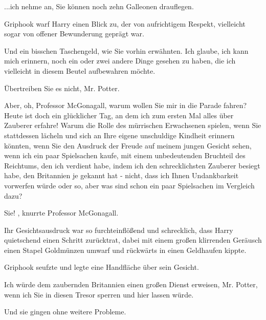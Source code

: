 \glqq ...ich nehme an, Sie können noch zehn
Galleonen drauflegen.\grqq{}

Griphook warf Harry einen Blick zu, der von aufrichtigem Respekt, vielleicht
sogar von offener Bewunderung geprägt war.

\glqq Und ein bisschen Taschengeld, wie Sie vorhin erwähnten. Ich
glaube, ich kann mich erinnern, noch ein oder zwei andere Dinge gesehen zu haben, die ich vielleicht in diesem Beutel
aufbewahren möchte.\grqq{}

\glqq Übertreiben Sie es nicht, Mr. Potter.\grqq{}

\glqq Aber, oh,
Professor McGonagall, warum wollen Sie mir in die Parade fahren? Heute ist doch ein glücklicher Tag, an dem ich zum
ersten Mal alles über Zauberer erfahre! Warum die Rolle des mürrischen Erwachsenen spielen, wenn Sie stattdessen lächeln
und sich an Ihre eigene unschuldige Kindheit erinnern könnten, wenn Sie den Ausdruck der Freude auf meinem jungen
Gesicht sehen, wenn ich ein paar Spielsachen kaufe, mit einem unbedeutenden Bruchteil des Reichtums, den ich verdient
habe, indem ich den schrecklichsten Zauberer besiegt habe, den Britannien je gekannt hat -
nicht, dass ich Ihnen
Undankbarkeit vorwerfen würde oder so, aber was sind schon ein paar Spielsachen im Vergleich dazu?\grqq{}

\glqq Sie!\grqq{} , knurrte Professor McGonagall.

Ihr Gesichtsausdruck war so furchteinflößend und
schrecklich, dass Harry quietschend einen Schritt zurücktrat, dabei mit einem großen klirrenden Geräusch einen Stapel
Goldmünzen umwarf und rückwärts in einen Geldhaufen kippte.

 Griphook seufzte und legte eine Handfläche über
sein Gesicht.

\glqq Ich würde dem zaubernden Britannien einen großen Dienst erweisen, Mr. Potter, wenn ich
Sie in diesen Tresor sperren und hier lassen würde. \glqq

Und sie gingen ohne weitere Probleme.
